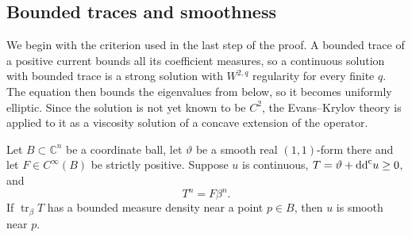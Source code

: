 \subsection{Bounded traces and smoothness}\label{sec:interior-criterion}

We begin with the criterion used in the last step of the proof. A bounded trace of a positive current bounds all its coefficient measures, so a continuous solution with bounded trace is a strong solution with $W^{2,q}$ regularity for every finite $q$. The equation then bounds the eigenvalues from below, so it becomes uniformly elliptic. Since the solution is not yet known to be $C^2$, the Evans--Krylov theory is applied to it as a viscosity solution of a concave extension of the operator.

\begin{proposition}\label{prop:interior-criterion}
Let $B\subset\mathbb C^n$ be a coordinate ball, let $\vartheta$ be a smooth real $(1,1)$-form there and let $F\in C^\infty(B)$ be strictly positive. Suppose $u$ is continuous, $T=\vartheta+\mathrm{dd}^{\mathrm{c}} u\geq0$, and
\begin{equation}\label{eq:interior-local-ma}
  T^n=F\beta^n.
\end{equation}
If $\operatorname{tr}_\beta T$ has a bounded measure density near a point $p\in B$, then $u$ is smooth near $p$.
\end{proposition}

